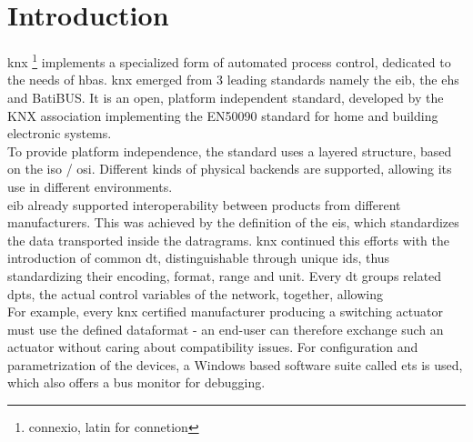 \section{Introduction}

\gls{knx} \footnote{connexio, latin for connetion} implements a specialized form of automated process control, dedicated to the needs of \gls{hbas}. \gls{knx}
emerged from 3 leading standards namely the \gls{eib}, the \gls{ehs} and BatiBUS. It is an open, platform independent standard,
developed by the KNX association implementing the EN50090 standard for home and building electronic systems.
\\
To provide platform independence, the standard uses a layered structure, based on the \gls{iso} / \gls{osi}. Different kinds of physical backends are supported,
allowing its use in different environments.
\\
\gls{eib} already supported interoperability between products from different manufacturers. This was achieved by
the definition of the \gls{eis}, which standardizes
the data transported inside the datragrams. \gls{knx} continued this efforts with the introduction of common \gls{dt}, distinguishable through unique ids, thus
standardizing their encoding, format, range and unit.
Every \gls{dt} groups related \glspl{dpt}, the actual control variables of the network, together, allowing 
\\
For example, every \gls{knx} 
certified manufacturer producing a switching actuator must use the defined dataformat - an end-user can therefore exchange such an actuator without caring
about compatibility issues. For configuration and parametrization of the devices, a Windows based software suite called \gls{ets} is used, which also offers
a bus monitor for debugging.
